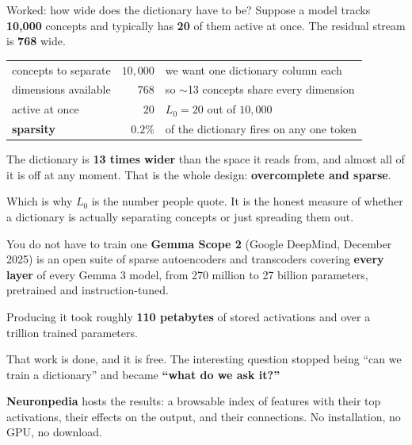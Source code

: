 \documentclass[aspectratio=169]{beamer}
\newcommand{\keybox}[1]{%
  \begin{tcolorbox}[colback=armblue!8, colframe=armblue, boxrule=0.6pt, arc=2pt]
  #1
  \end{tcolorbox}}
\begin{document}
\begin{frame}{Worked: how wide does the dictionary have to be?}
  \vspace{0.5em}
  Suppose a model tracks \textbf{10{,}000} concepts and typically has \textbf{20} of them active
  at once. The residual stream is \textbf{768} wide.

  \vspace{0.6em}
  \begin{center}
  \small
  \begin{tabular}{@{}lrl@{}}
    \toprule
    concepts to separate & $10{,}000$ & we want one dictionary column each\\
    dimensions available & $768$ & so $\sim$13 concepts share every dimension\\
    active at once & $20$ & $L_0 = 20$ out of $10{,}000$\\
    \midrule
    \textbf{sparsity} & $\mathbf{0.2\%}$ & of the dictionary fires on any one token\\
    \bottomrule
  \end{tabular}
  \end{center}

  \vspace{0.7em}
  \keybox{The dictionary is \textbf{13 times wider} than the space it reads from, and almost all
  of it is off at any moment. That is the whole design: \textbf{overcomplete and sparse}.}

  \vspace{0.5em}
  {\footnotesize Which is why $L_0$ is the number people quote. It is the honest measure of
  whether a dictionary is actually separating concepts or just spreading them out.}
\end{frame}

\begin{frame}{You do not have to train one}
  \vspace{0.7em}
  \textbf{Gemma Scope 2} (Google DeepMind, December 2025) is an open suite of sparse autoencoders
  and transcoders covering \textbf{every layer} of every Gemma 3 model, from 270 million to 27
  billion parameters, pretrained and instruction-tuned.

  \vspace{0.6em}
  Producing it took roughly \textbf{110 petabytes} of stored activations and over a trillion
  trained parameters.

  \vspace{0.9em}
  \keybox{That work is done, and it is free. The interesting question stopped being ``can we
  train a dictionary'' and became \textbf{``what do we ask it?''}}

  \vspace{0.8em}
  \textbf{Neuronpedia} hosts the results: a browsable index of features with their top
  activations, their effects on the output, and their connections. No installation, no GPU, no
  download.
\end{frame}
\end{document}
